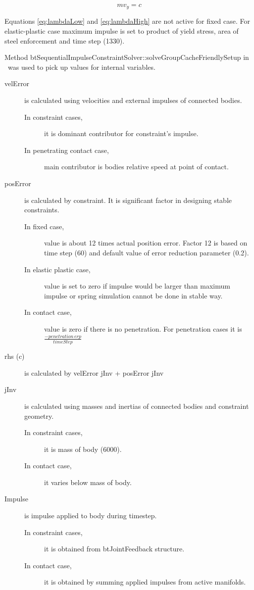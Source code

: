 \begin{equation} \label{eq:fixedConstraint}
m v_y = c 
\end{equation}

Equations \ref{eq:lambdaLow} and \ref{eq:lambdaHigh} are not active for fixed case.
For elastic-plastic case maximum impulse is set to product of yield stress, area of steel enforcement and time step (1330).

Method btSequentialImpulseConstraintSolver::solveGroupCacheFriendlySetup
in \bullet\ was used to pick up values for internal variables. 

\begin{description}
\item[velError] is calculated using velocities and external impulses of connected bodies. 
 \begin{description}
\item[In constraint cases,] it is dominant contributor for constraint's impulse.
\item[In penetrating contact case,] main contributor is bodies relative speed at point of contact. 
\end{description}
\item[posError] is calculated by constraint. It is significant factor in designing stable constraints.
 \begin{description}
 \item[In fixed case,] value is about 12 times actual position error. Factor 12 is based on time step (60) 
 and default value of error reduction parameter (0.2).
 \item[In elastic plastic case,]  value is set to zero if impulse would be larger than maximum impulse or
spring simulation cannot be done in stable way.
 \item[In contact case,] value is zero if there is no penetration. For penetration cases it is 
$\frac{-penetration\, erp}{timeStep}$
 \end{description}
\item[rhs (c)] is calculated by velError jInv + posError jInv
\item[jInv] is calculated using masses and inertias of connected bodies and constraint geometry. 
 \begin{description}
\item[In constraint cases,] it is mass of body (6000).
\item[In contact case,] it varies below mass of body.
\end{description}
\item[Impulse] is impulse applied to body during timestep.
 \begin{description}
\item[In constraint cases,] it is obtained from btJointFeedback structure.
\item[In contact case,] it is obtained by summing applied impulses from active manifolds.
\end{description}
\end{description}

